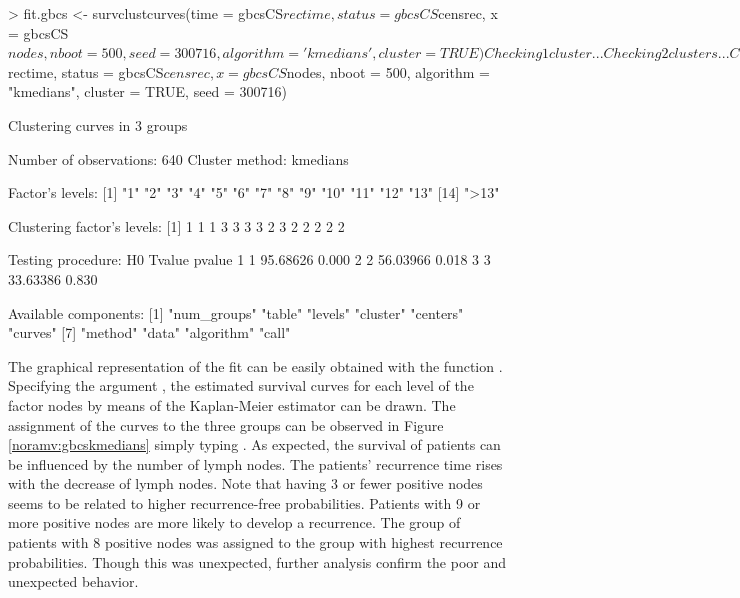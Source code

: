 \begin{example}
> fit.gbcs <- survclustcurves(time = gbcsCS$rectime, status = gbcsCS$censrec, 
		x = gbcsCS$nodes, nboot = 500, seed = 300716, algorithm = 'kmedians',
	        cluster = TRUE)             
Checking 1 cluster... 
Checking 2 clusters... 
Checking 3 clusters... 

Finally, there are 3 clusters. 
> summary(fit.gbcs)

Call:  
survclustcurves(time = gbcsCS$rectime, status = gbcsCS$censrec, 
    x = gbcsCS$nodes, nboot = 500, algorithm = "kmedians", cluster = TRUE, 
    seed = 300716)

Clustering curves in 3 groups

Number of observations:  640
Cluster method:  kmedians 

Factor's levels:
 [1] "1"   "2"   "3"   "4"   "5"   "6"   "7"   "8"   "9"   "10"  "11"  "12"  "13" 
[14] ">13"

Clustering factor's levels:
 [1] 1 1 1 3 3 3 3 2 3 2 2 2 2 2

Testing procedure:
  H0   Tvalue pvalue
1  1 95.68626  0.000
2  2 56.03966  0.018
3  3 33.63386  0.830

Available components:
 [1] "num_groups" "table"      "levels"     "cluster"    "centers"    "curves"    
 [7] "method"     "data"       "algorithm"  "call"  
\end{example} 


The graphical representation of the fit  can be easily obtained with the function   .  Specifying the argument , the estimated survival curves for each level of the factor nodes by means of the Kaplan-Meier estimator can be drawn. The assignment of the curves to the three groups can be observed in Figure \ref{noramv:gbcskmedians} simply typing .  As expected, the survival of patients can be influenced by the number of lymph nodes. The patients' recurrence time rises with the decrease of lymph nodes. Note that having 3 or fewer positive nodes seems to be related to higher recurrence-free probabilities. Patients with 9 or more positive nodes are more likely to develop a recurrence. The group of patients with 8 positive nodes was assigned to the group with highest recurrence probabilities. Though this was unexpected, further analysis confirm the poor and unexpected behavior.

